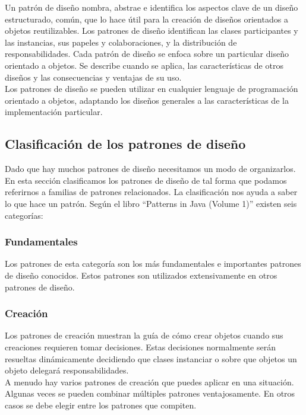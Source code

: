   Un patrón de diseño nombra, abstrae e identifica los aspectos clave de un diseño estructurado, común, que lo hace útil para la creación de diseños orientados a objetos   reutilizables. Los patrones de diseño identifican las clases participantes y las instancias, sus papeles y colaboraciones, y la distribución de responsabilidades. Cada patrón de diseño se
  enfoca sobre un particular diseño orientado a objetos. Se describe cuando se aplica, las características de otros diseños y las consecuencias y ventajas de su uso. \\
  
  Los patrones de diseño se pueden utilizar en cualquier lenguaje de programación orientado a objetos, adaptando los diseños generales a las características de la implementación particular.
  
  \subsection{Clasificación de los patrones de diseño}
  Dado que hay muchos patrones de diseño necesitamos un modo de organizarlos. En esta sección clasificamos los patrones de diseño de tal forma que podamos referirnos a familias de patrones relacionados. La clasificación nos ayuda a saber lo que hace un patrón. Según el libro “Patterns in Java (Volume 1)” existen seis categorías:
  
  \subsubsection{Fundamentales}
  Los patrones de esta categoría son los más fundamentales e importantes patrones de diseño
  conocidos. Estos patrones son utilizados extensivamente en otros patrones de diseño.
  
  \subsubsection{Creación}
  Los patrones de creación muestran la guía de cómo crear objetos cuando sus creaciones requieren tomar decisiones. Estas decisiones normalmente serán resueltas dinámicamente decidiendo que clases instanciar o sobre que objetos un objeto delegará responsabilidades. \\
  
  A menudo hay varios patrones de creación que puedes aplicar en una situación. Algunas  veces se pueden combinar múltiples patrones ventajosamente. En otros casos se debe elegir  entre los patrones que compiten.
  
